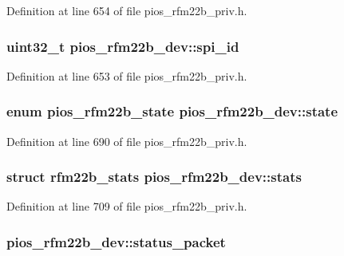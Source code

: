 \-Definition at line 654 of file pios\-\_\-rfm22b\-\_\-priv.\-h.

\hypertarget{structpios__rfm22b__dev_a7fae761882f21a9a0088db1f81dd41da}{
\subsubsection[{spi\-\_\-id}]{\setlength{\rightskip}{0pt plus 5cm}uint32\-\_\-t {\bf pios\-\_\-rfm22b\-\_\-dev\-::spi\-\_\-id}}}\label{structpios__rfm22b__dev_a7fae761882f21a9a0088db1f81dd41da}


\-Definition at line 653 of file pios\-\_\-rfm22b\-\_\-priv.\-h.

\hypertarget{structpios__rfm22b__dev_a2725ce50c0aad0fae1e4cee8e29072f7}{
\subsubsection[{state}]{\setlength{\rightskip}{0pt plus 5cm}enum {\bf pios\-\_\-rfm22b\-\_\-state} {\bf pios\-\_\-rfm22b\-\_\-dev\-::state}}}\label{structpios__rfm22b__dev_a2725ce50c0aad0fae1e4cee8e29072f7}


\-Definition at line 690 of file pios\-\_\-rfm22b\-\_\-priv.\-h.

\hypertarget{structpios__rfm22b__dev_abb8511852ba38b8de9c19aaae6a495f0}{
\subsubsection[{stats}]{\setlength{\rightskip}{0pt plus 5cm}struct {\bf rfm22b\-\_\-stats} {\bf pios\-\_\-rfm22b\-\_\-dev\-::stats}}}\label{structpios__rfm22b__dev_abb8511852ba38b8de9c19aaae6a495f0}


\-Definition at line 709 of file pios\-\_\-rfm22b\-\_\-priv.\-h.

\hypertarget{structpios__rfm22b__dev_a655ec6ecb5828af1262a9108c8fb25f7}{
\subsubsection[{status\-\_\-packet}]{ {\bf pios\-\_\-rfm22b\-\_\-dev\-::status\-\_\-packet}}}\label{structpios__rfm22b__dev_a655ec6ecb5828af1262a9108c8fb25f7}


